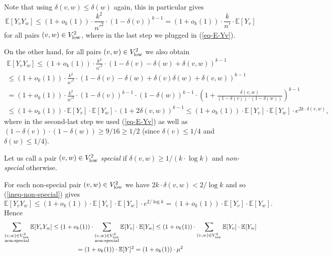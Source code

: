 Note that using $\delta(v,w)\leq \delta(w)$ again, this in particular gives
\begin{equation}\label{ineq-special}
\mathbb{E}[Y_vY_w]\leq (1+o_k(1))\cdot\frac{k^2}{n'^2}\cdot(1-\delta(v))^{k-1}=(1+o_k(1))\cdot\frac{k}{n'}\cdot \mathbb{E}[Y_v]
\end{equation}
for all pairs $(v,w)\in V_{\textnormal{low}}^2$, where in the last step we plugged in (\ref{eq-E-Yv}).

On the other hand, for all pairs $(v,w)\in V_{\textnormal{low}}^2$ we also obtain
\begin{multline}\label{ineq-non-special}
\mathbb{E}[Y_vY_w]\leq (1+o_k(1))\cdot \frac{k^2}{n'^2}\cdot(1-\delta(v)-\delta(w)+\delta(v,w))^{k-1}\\
\leq (1+o_k(1))\cdot \frac{k^2}{n'^2}\cdot(1-\delta(v)-\delta(w)+\delta(v)\delta(w)+\delta(v,w))^{k-1}\\
=(1+o_k(1))\cdot \frac{k^2}{n'^2}\cdot(1-\delta(v))^{k-1}\cdot(1-\delta(w))^{k-1}\cdot \left(1+\frac{\delta(v,w)}{(1-\delta(v))\cdot (1-\delta(w))}\right)^{k-1}\\
\leq (1+o_k(1))\cdot\mathbb{E}[Y_v]\cdot \mathbb{E}[Y_w]\cdot (1+2\delta(v,w))^{k-1}\leq (1+o_k(1))\cdot\mathbb{E}[Y_v]\cdot \mathbb{E}[Y_w]\cdot e^{2k\cdot \delta(v,w)},
\end{multline}
where in the second-last step we used (\ref{eq-E-Yv}) as well as $(1-\delta(v))\cdot (1-\delta(w))\geq 9/16\geq 1/2$ (since $\delta(v)\leq 1/4$ and $\delta(w)\leq 1/4$).

Let us call a pair $(v,w)\in V_{\textnormal{low}}^2$ \emph{special} if $\delta(v,w)\geq 1/(k\cdot \log k)$ and  \emph{non-special} otherwise.

For each non-special pair $(v,w)\in V_{\textnormal{low}}^2$ we have $2k\cdot \delta(v,w)< 2/\log k$ and so (\ref{ineq-non-special}) gives
\[\mathbb{E}[Y_vY_w]\leq (1+o_k(1))\cdot\mathbb{E}[Y_v]\cdot \mathbb{E}[Y_w]\cdot e^{2/\log k}=(1+o_k(1))\cdot\mathbb{E}[Y_v]\cdot \mathbb{E}[Y_w].\]
Hence
\begin{multline}\label{ineq-non-special-2}
\sum_{\substack{(v,w)\in V_{\textnormal{low}}^2\\\text{non-special}}}\mathbb{E}[Y_vY_w]\leq (1+o_k(1))\cdot \sum_{\substack{(v,w)\in V_{\textnormal{low}}^2\\\text{non-special}}}\mathbb{E}[Y_v]\cdot \mathbb{E}[Y_w]\leq (1+o_k(1))\cdot \sum_{(v,w)\in V_{\textnormal{low}}^2}\mathbb{E}[Y_v]\cdot \mathbb{E}[Y_w]\\
= (1+o_k(1))\cdot\mathbb{E}[Y]^2=(1+o_k(1))\cdot\mu^2
\end{multline}

